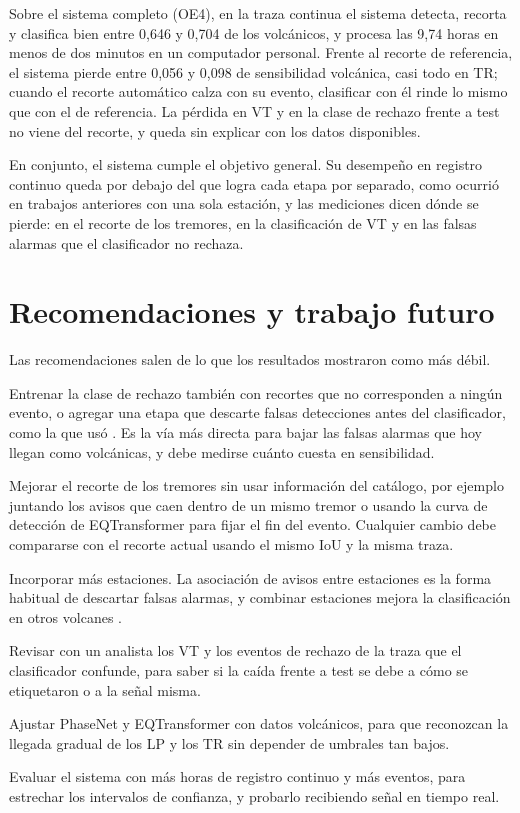 Sobre el sistema completo (OE4), en la traza continua el sistema detecta,
recorta y clasifica bien entre 0,646 y 0,704 de los volcánicos, y procesa las
9,74 horas en menos de dos minutos en un computador personal. Frente al
recorte de referencia, el sistema pierde entre 0,056 y 0,098 de sensibilidad
volcánica, casi todo en TR; cuando el recorte automático calza con su evento,
clasificar con él rinde lo mismo que con el de referencia. La pérdida en VT y
en la clase de rechazo frente a test no viene del recorte, y queda sin
explicar con los datos disponibles.

En conjunto, el sistema cumple el objetivo general. Su desempeño en registro
continuo queda por debajo del que logra cada etapa por separado, como ocurrió
en trabajos anteriores con una sola estación, y las mediciones dicen dónde se
pierde: en el recorte de los tremores, en la clasificación de VT y en las
falsas alarmas que el clasificador no rechaza.

\section{Recomendaciones y trabajo futuro}

Las recomendaciones salen de lo que los resultados mostraron como más débil.

Entrenar la clase de rechazo también con recortes que no corresponden a ningún
evento, o agregar una etapa que descarte falsas detecciones antes del
clasificador, como la que usó \textcite{soto2016llaima}. Es la vía más directa
para bajar las falsas alarmas que hoy llegan como volcánicas, y debe medirse
cuánto cuesta en sensibilidad.

Mejorar el recorte de los tremores sin usar información del catálogo, por
ejemplo juntando los avisos que caen dentro de un mismo tremor o usando la
curva de detección de EQTransformer para fijar el fin del evento. Cualquier
cambio debe compararse con el recorte actual usando el mismo IoU y la misma
traza.

Incorporar más estaciones. La asociación de avisos entre estaciones es la
forma habitual de descartar falsas alarmas, y combinar estaciones mejora la
clasificación en otros volcanes \parencite{curilem2016estaciones}.

Revisar con un analista los VT y los eventos de rechazo de la traza que el
clasificador confunde, para saber si la caída frente a test se debe a cómo se
etiquetaron o a la señal misma.

Ajustar PhaseNet y EQTransformer con datos volcánicos, para que reconozcan la
llegada gradual de los LP y los TR sin depender de umbrales tan bajos.

Evaluar el sistema con más horas de registro continuo y más eventos, para
estrechar los intervalos de confianza, y probarlo recibiendo señal en tiempo
real.

